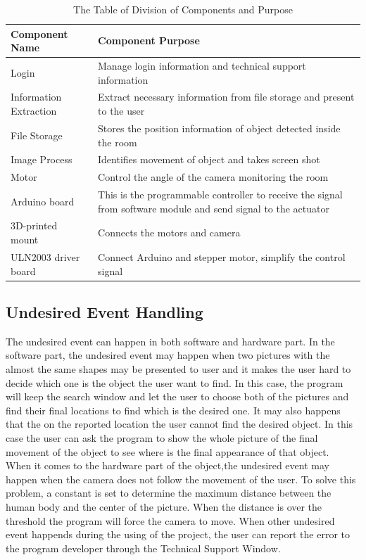 \documentclass[12pt, titlepage]{article}
\begin{document}
\begin{table}[H]
\begin{center}
\caption {The Table of Division of Components and Purpose}
    \begin{tabular}{| p{5cm}| p{9.5cm} |}
    \hline
    \textbf{Component Name} & \textbf{Component Purpose}  \\
    \hline
    Login & Manage login information and technical support information\\
    \hline
    Information Extraction & Extract necessary information from file storage and present to the user\\
    \hline
    File Storage  & Stores the position information of object detected inside the room\\
    \hline
    Image Process & Identifies movement of object and takes screen shot\\
    \hline
    Motor & Control the angle of the camera monitoring the room\\
    \hline
    Arduino board & This is the programmable controller to receive the signal from software module and send signal to the actuator \\
    \hline
    3D-printed mount&Connects the motors and camera \\
   	\hline
   	ULN2003 driver board&Connect Arduino and stepper motor, simplify the control signal\\
    \hline
    \end{tabular}
\end{center}
\end{table}
\subsection{Undesired Event Handling}

The undesired event can happen in both software and hardware part. In the software part, the undesired event may happen when two pictures with the almost the same shapes may be presented to user and it makes the user hard to decide which one is the object the user want to find. In this case, the program will keep the search window and let the user to choose both of the pictures and find their final locations to find which is the desired one. It may also happens that the on the reported location the user cannot find the desired object. In this case the user can ask the program to show the whole picture of the final movement of the object to see where is the final appearance of that object.\\
When it comes to the hardware part of the object,the undesired event may happen when the camera does not follow the movement of the user. To solve this problem, a constant is set to determine the maximum distance between the human body and the center of the picture. When the distance is over the threshold the program will force the camera to move. When other undesired event happends during the using of the project, the user can report the error to the program developer through the Technical Support Window. 
\end{document}
